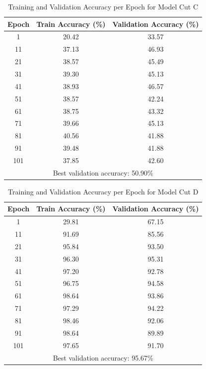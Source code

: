 \documentclass[11pt]{scrartcl}
\begin{document}
\begin{table}[htbp]
\centering
\caption{Training and Validation Accuracy per Epoch for Model Cut C}
\begin{tabular}{ccc}
\toprule
\textbf{Epoch} & \textbf{Train Accuracy (\%)} & \textbf{Validation Accuracy (\%)} \\
\midrule
1    & 20.42 & 33.57 \\
11   & 37.13 & 46.93 \\
21   & 38.57 & 45.49 \\
31   & 39.30 & 45.13 \\
41   & 38.93 & 46.57 \\
51   & 38.57 & 42.24 \\
61   & 38.75 & 43.32 \\
71   & 39.66 & 45.13 \\
81   & 40.56 & 41.88 \\
91   & 39.48 & 41.88 \\
101  & 37.85 & 42.60 \\
\midrule
\multicolumn{3}{c}{Best validation accuracy: 50.90\%} \\
\bottomrule
\end{tabular}
\label{tab:task3-model-cutc-accuracy}
\end{table}

\begin{table}[htbp]
\centering
\caption{Training and Validation Accuracy per Epoch for Model Cut D}
\begin{tabular}{ccc}
\toprule
\textbf{Epoch} & \textbf{Train Accuracy (\%)} & \textbf{Validation Accuracy (\%)} \\
\midrule
1    & 29.81 & 67.15 \\
11   & 91.69 & 85.56 \\
21   & 95.84 & 93.50 \\
31   & 96.30 & 95.31 \\
41   & 97.20 & 92.78 \\
51   & 96.75 & 94.58 \\
61   & 98.64 & 93.86 \\
71   & 97.29 & 94.22 \\
81   & 98.46 & 92.06 \\
91   & 98.64 & 89.89 \\
101  & 97.65 & 91.70 \\
\midrule
\multicolumn{3}{c}{Best validation accuracy: 95.67\%} \\
\bottomrule
\end{tabular}
\label{tab:task3-model-cutd-accuracy}
\end{table}
\end{document}
